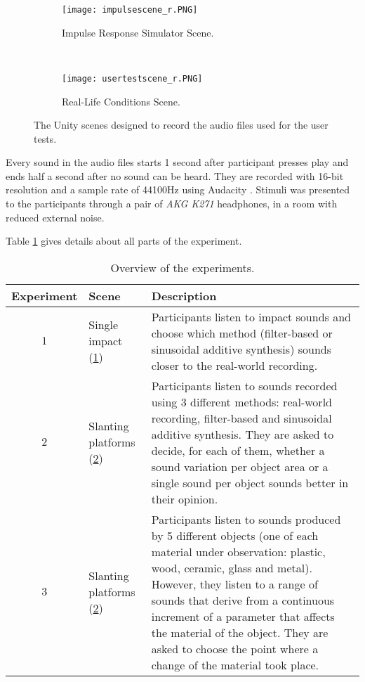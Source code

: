 \begin{figure}[H]
    \centering
    \begin{subfigure}[b]{0.48\textwidth}
        \texttt{[image: impulsescene\_r.PNG]}
        \caption{Impulse Response Simulator Scene.}
        \label{fig:test_sc1}
    \end{subfigure}
    ~ %
    \begin{subfigure}[b]{0.48\textwidth}
        \texttt{[image: usertestscene\_r.PNG]}
        \caption{Real-Life Conditions Scene.}
        \label{fig:test_sc2}
    \end{subfigure}
    \caption{The Unity\textsuperscript{\textregistered} scenes designed to record the audio files used for the user tests.}\label{fig:test_scenes}
\end{figure}

Every sound in the audio files starts 1 second after participant presses play and ends half a second after no sound can be heard. They are recorded with 16-bit resolution and a sample rate of 44100Hz using Audacity\textsuperscript{\textregistered} \cite{bib:audacity}. Stimuli was presented to the participants through a pair of \textit{AKG K271} headphones, in a room with reduced external noise.

Table \ref{tab:test_dec} gives details about all parts of the experiment.

\begin{table}[H]
	\centering
    \begin{tabular}{ c  l  p{7cm}  }
    \toprule
    \textbf{Experiment} & \textbf{Scene} & \textbf{Description} \\ \toprule
    \addlinespace
    $1$ & Single impact (\ref{fig:test_sc1}) & Participants listen to impact sounds and choose which method (filter-based or sinusoidal additive synthesis) sounds closer to the real-world recording.  \\
    \addlinespace
    $2$ & Slanting platforms (\ref{fig:test_sc2}) & Participants listen to sounds recorded using 3 different methods: real-world recording, filter-based and sinusoidal additive synthesis. They are asked to decide, for each of them, whether a sound variation per object area or a single sound per object sounds better in their opinion.  \\
    \addlinespace
    $3$ & Slanting platforms (\ref{fig:test_sc2}) & Participants listen to sounds produced by 5 different objects (one of each material under observation: plastic, wood, ceramic, glass and metal). However, they listen to a range of sounds that derive from a continuous increment of a parameter that affects the material of the object. They are asked to choose the point where a change of the material took place. \\ 
    \bottomrule
    \end{tabular}
    \caption{Overview of the experiments.}
    \label{tab:test_dec}
\end{table} 


